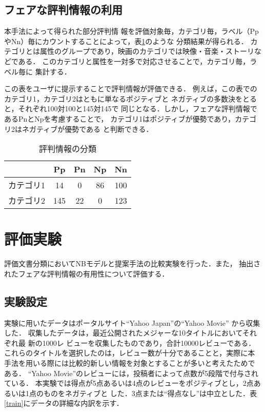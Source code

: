 \documentclass[japanese]{jnlp_1.3c}
\begin{document}
\subsection{フェアな評判情報の利用}
本手法によって得られた部分評判情
報を評価対象毎，カテゴリ毎，ラベル（PpやNn）毎にカウントすることによって，表\ref{class}のような
分類結果が得られる．
カテゴリとは属性のグループであり，映画のカテゴリでは映像・音楽・ストーリなどである．
このカテゴリと属性を一対多で対応させることで，カテゴリ毎，ラベル毎に
集計する．

この表をユーザに提示することで評判情報が評価できる．
例えば，この表でのカテゴリ1，カテゴリ2はともに単なるポジティブと
ネガティブの多数決をとると，それぞれ100対100と145対145で
同じとなる．しかし，フェアな評判情報であるPnとNpを考慮することで，
カテゴリ1はポジティブが優勢であり，カテゴリ2はネガティブが優勢である
と判断できる．

\begin{table}[t]
\caption{評判情報の分類}
\label{class}
\begin{center}
\begin{tabular}{|c|c|c|c|c|} \hline
  & Pp & Pn & Np & Nn \\ \hline
カテゴリ1 & 14 & 0 & 86 & 100 \\ \hline
カテゴリ2  & 145 & 22 & 0 & 123 \\ \hline
\end{tabular}
\end{center}
\end{table}




\section{評価実験}

評価文書分類においてNBモデルと提案手法の比較実験を行った．また，
抽出されたフェアな評判情報の有用性について評価する．

\subsection{実験設定}

実験に用いたデータはポータルサイト``Yahoo Japan''の``Yahoo Movie''
から収集した．
収集したデータは，最近公開されたメジャーな10タイトルにおいてそれぞれ最
新の1000レ
ビューを収集したものであり，合計10000レビューである．
これらのタイトルを選択したのは，レビュー数が十分であることと，実際に本
手法を用いる際には比較的新しい情報を対象とすることが多いと考えたためで
ある．
``Yahoo Movie''のレビューには，投稿者によって点数が5段階で付与されている．
本実験では得点が5点あるいは4点のレビューをポジティブとし，2点あるいは1点のものをネガティブと
した．3点または“得点なし”は中立とした．表\ref{train}にデータの詳細な内訳を示す．
\end{document}
